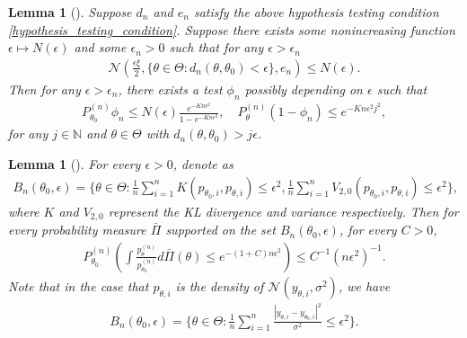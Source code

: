 \documentclass{article}
\newcommand{\N}{\mathcal{N}}
\theoremstyle{plain}
\newtheorem{lemma}[theorem]{Lemma}
\theoremstyle{definition}
\theoremstyle{remark}
\begin{document}
\begin{lemma}[{\citep[Lemma 9] {ghosal2007convergence}}] \label{enhanced_testing_lemma}
Suppose $d_n$ and $e_n$ satisfy the above hypothesis testing condition \eqref{hypothesis_testing_condition}. Suppose there exists some nonincreasing function $\epsilon \mapsto N(\epsilon)$ and some $\epsilon_n > 0$ such that for any $\epsilon > \epsilon_n$
\begin{align*}
    \N(\frac{\epsilon \xi
    }{2}, \{\theta \in \Theta: d_n(\theta, \theta_0) < \epsilon\}, e_n) \leq N(\epsilon).
\end{align*}
Then for any $\epsilon > \epsilon_n$, there exists a test $\phi_n$ possibly depending on $\epsilon$ such that
\begin{align*}
    P_{\theta_0}^{(n)} \phi_n \leq N(\epsilon) \frac{e^{-K n \epsilon^2}}{1 - e^{-K n \epsilon^2}}, \quad P_\theta^{(n)} (1 - \phi_n) \leq e^{-K n \epsilon^2 j^2},
\end{align*}
for any $j \in \mathbb{N}$ and $\theta \in \Theta$ with $d_n(\theta, \theta_0) > j \epsilon$.
\end{lemma}

\begin{lemma}[{\citep[Lemma 10]{ghosal2007convergence}}] \label{evidence_lower_bound}
    For every $\epsilon > 0$, denote as
    \begin{align*}
        B_n(\theta_0, \epsilon) = \{\theta \in \Theta: \frac{1}{n} \sum_{i=1}^n K(p_{\theta_0, i}, p_{\theta, i}) \leq  \epsilon^2, \frac{1}{n}\sum_{i=1}^n V_{2, 0}(p_{\theta_0, i}, p_{\theta, i})\leq  \epsilon^2 \},
    \end{align*}
    where $K$ and $V_{2, 0}$ represent the KL divergence and variance respectively. Then for every probability measure $\bar{\Pi}$ supported on the set $B_n(\theta_0, \epsilon)$, for every $C > 0$, 
    \begin{align*}
        P_{\theta_0}^{(n)} \left(\int \frac{p_{\theta}^{(n)}}{p_{\theta_0}^{(n)}} d\bar{\Pi}(\theta) \leq e^{-(1 + C) n \epsilon^2}\right) \leq C^{-1} (n \epsilon^2)^{-1}.
    \end{align*}
    Note that in the case that $p_{\theta, i}$ is the density of $\N(y_{\theta, i}, \sigma^2)$, we have
    \begin{align*}
        B_n(\theta_0, \epsilon) = \{\theta \in \Theta: \frac{1}{n} \sum_{i=1}^n \frac{|y_{\theta, i} - y_{\theta_0, i}|^2}{\sigma^2} \leq \epsilon^2\}.
    \end{align*}
\end{lemma}
\end{document}
